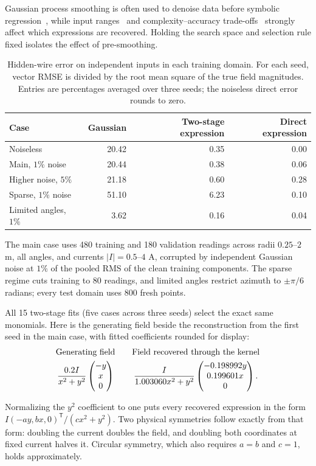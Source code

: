 \documentclass[11pt]{article}
\newcommand{\x}{\mathbf x}
\begin{document}
Gaussian process smoothing is often used to denoise data before symbolic
regression~\cite{hsin}, while input ranges~\cite{matsubara} and
complexity--accuracy trade-offs~\cite{fong} strongly affect which expressions
are recovered. Holding the search space and selection rule fixed isolates the
effect of pre-smoothing.

\begin{table}[!htbp]
\centering
\caption{Hidden-wire error on independent inputs in each training domain.
For each seed, vector RMSE is divided by the root mean square of the true field
magnitudes. Entries are percentages averaged over three seeds; the noiseless
direct error rounds to zero.}
\label{tab:wire}
\small
\begin{tabular}{@{}lrrr@{}}
\toprule
Case & Gaussian & Two-stage expression & Direct expression\\
\midrule
Noiseless                & 20.42 & 0.35 & 0.00 \\
Main, \(1\%\) noise      & 20.44 & 0.38 & 0.06 \\
Higher noise, \(5\%\)    & 21.18 & 0.60 & 0.28 \\
Sparse, \(1\%\) noise    & 51.10 & 6.23 & 0.10 \\
Limited angles, \(1\%\)  &  3.62 & 0.16 & 0.04 \\
\bottomrule
\end{tabular}
\end{table}

The main case uses 480 training and 180 validation readings across radii
\(0.25\)--\(2\) m, all angles, and currents \(|I|=0.5\)--\(4\) A, corrupted by
independent Gaussian noise at \(1\%\) of the pooled RMS of the clean training
components. The sparse regime cuts training to 80 readings, and limited angles
restrict azimuth to \(\pm\pi/6\) radians; every test domain uses 800 fresh
points.

All 15 two-stage fits (five cases across three seeds) select the exact same
monomials. Here is the generating field beside the reconstruction from the
first seed in the main case, with fitted coefficients rounded for display:
\[
\begin{array}{c@{\qquad}c}
\text{Generating field} & \text{Field recovered through the kernel}\\[4pt]
\displaystyle\frac{0.2 I}{x^2+y^2}
  \begin{pmatrix}-y\\x\\0\end{pmatrix}
&
\displaystyle\frac{I}{1.003060 x^2+y^2}
  \begin{pmatrix}-0.198992 y\\0.199601 x\\0\end{pmatrix}.
\end{array}
\]
\par
Normalizing the \(y^2\) coefficient to one puts every recovered expression in
the form \(I(-a y,b x,0)^{\mathsf T}/(c x^2+y^2)\). Two physical symmetries
follow exactly from that form: doubling the current doubles the field, and
doubling both coordinates at fixed current halves it. Circular symmetry, which
also requires \(a=b\) and \(c=1\), holds approximately.
\par
\end{document}
